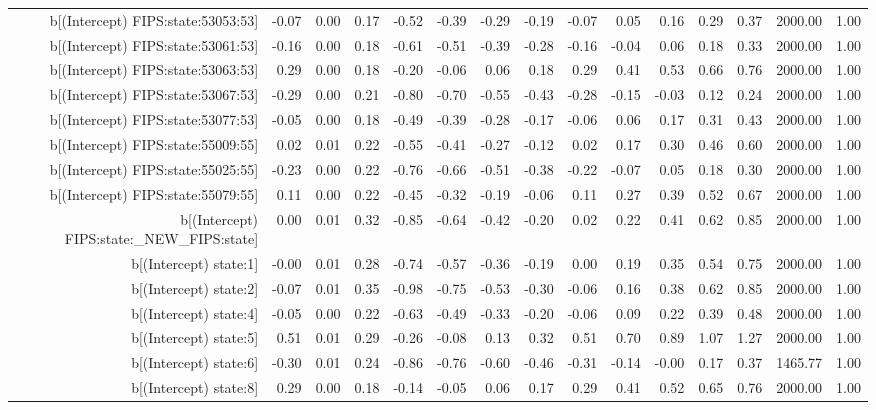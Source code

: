 \begin{table}[ht]
\begin{tabular}{rrrrrrrrrrrrrrr}
  b[(Intercept) FIPS:state:53053:53] & -0.07 & 0.00 & 0.17 & -0.52 & -0.39 & -0.29 & -0.19 & -0.07 & 0.05 & 0.16 & 0.29 & 0.37 & 2000.00 & 1.00 \\ 
  b[(Intercept) FIPS:state:53061:53] & -0.16 & 0.00 & 0.18 & -0.61 & -0.51 & -0.39 & -0.28 & -0.16 & -0.04 & 0.06 & 0.18 & 0.33 & 2000.00 & 1.00 \\ 
  b[(Intercept) FIPS:state:53063:53] & 0.29 & 0.00 & 0.18 & -0.20 & -0.06 & 0.06 & 0.18 & 0.29 & 0.41 & 0.53 & 0.66 & 0.76 & 2000.00 & 1.00 \\ 
  b[(Intercept) FIPS:state:53067:53] & -0.29 & 0.00 & 0.21 & -0.80 & -0.70 & -0.55 & -0.43 & -0.28 & -0.15 & -0.03 & 0.12 & 0.24 & 2000.00 & 1.00 \\ 
  b[(Intercept) FIPS:state:53077:53] & -0.05 & 0.00 & 0.18 & -0.49 & -0.39 & -0.28 & -0.17 & -0.06 & 0.06 & 0.17 & 0.31 & 0.43 & 2000.00 & 1.00 \\ 
  b[(Intercept) FIPS:state:55009:55] & 0.02 & 0.01 & 0.22 & -0.55 & -0.41 & -0.27 & -0.12 & 0.02 & 0.17 & 0.30 & 0.46 & 0.60 & 2000.00 & 1.00 \\ 
  b[(Intercept) FIPS:state:55025:55] & -0.23 & 0.00 & 0.22 & -0.76 & -0.66 & -0.51 & -0.38 & -0.22 & -0.07 & 0.05 & 0.18 & 0.30 & 2000.00 & 1.00 \\ 
  b[(Intercept) FIPS:state:55079:55] & 0.11 & 0.00 & 0.22 & -0.45 & -0.32 & -0.19 & -0.06 & 0.11 & 0.27 & 0.39 & 0.52 & 0.67 & 2000.00 & 1.00 \\ 
  b[(Intercept) FIPS:state:\_NEW\_FIPS:state] & 0.00 & 0.01 & 0.32 & -0.85 & -0.64 & -0.42 & -0.20 & 0.02 & 0.22 & 0.41 & 0.62 & 0.85 & 2000.00 & 1.00 \\ 
  b[(Intercept) state:1] & -0.00 & 0.01 & 0.28 & -0.74 & -0.57 & -0.36 & -0.19 & 0.00 & 0.19 & 0.35 & 0.54 & 0.75 & 2000.00 & 1.00 \\ 
  b[(Intercept) state:2] & -0.07 & 0.01 & 0.35 & -0.98 & -0.75 & -0.53 & -0.30 & -0.06 & 0.16 & 0.38 & 0.62 & 0.85 & 2000.00 & 1.00 \\ 
  b[(Intercept) state:4] & -0.05 & 0.00 & 0.22 & -0.63 & -0.49 & -0.33 & -0.20 & -0.06 & 0.09 & 0.22 & 0.39 & 0.48 & 2000.00 & 1.00 \\ 
  b[(Intercept) state:5] & 0.51 & 0.01 & 0.29 & -0.26 & -0.08 & 0.13 & 0.32 & 0.51 & 0.70 & 0.89 & 1.07 & 1.27 & 2000.00 & 1.00 \\ 
  b[(Intercept) state:6] & -0.30 & 0.01 & 0.24 & -0.86 & -0.76 & -0.60 & -0.46 & -0.31 & -0.14 & -0.00 & 0.17 & 0.37 & 1465.77 & 1.00 \\ 
  b[(Intercept) state:8] & 0.29 & 0.00 & 0.18 & -0.14 & -0.05 & 0.06 & 0.17 & 0.29 & 0.41 & 0.52 & 0.65 & 0.76 & 2000.00 & 1.00 \\ 

\end{tabular}
\end{table}
